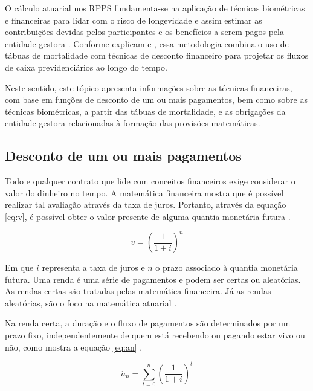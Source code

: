 O cálculo atuarial nos RPPS fundamenta-se na aplicação de técnicas biométricas e financeiras para lidar com o risco de longevidade e assim estimar as contribuições devidas pelos participantes e os benefícios a serem pagos pela entidade gestora \cite{lopes2010impacto}. Conforme explicam  e , essa metodologia combina o uso de tábuas de mortalidade com técnicas de desconto financeiro para projetar os fluxos de caixa previdenciários ao longo do tempo.

Neste sentido, este tópico apresenta informações sobre as técnicas financeiras, com base em funções de desconto de um ou mais pagamentos, bem como sobre as técnicas biométricas, a partir das tábuas de mortalidade, e as obrigações da entidade gestora relacionadas à formação das provisões matemáticas.

\subsection{Desconto de um ou mais pagamentos}

Todo e qualquer contrato que lide com conceitos financeiros exige considerar o valor do dinheiro no tempo. A matemática financeira mostra que é possível realizar tal avaliação através da taxa de juros. Portanto, através da equação \ref{eq:v}, é possível obter o valor presente de alguma quantia monetária futura \cite{rodrigues2012risco}.

\begin{equation}
    v = \left(\frac{1}{1+i}\right)^{n}
    \label{eq:v}
\end{equation}

\noindent Em que $i$ representa a taxa de juros e $n$ o prazo associado à quantia monetária futura. Uma renda é uma série de pagamentos e podem ser certas ou aleatórias. As rendas certas são tratadas pelas matemática financeira. Já as rendas aleatórias, são o foco na matemática atuarial \cite{cordeiro2014calculo, vilanoca1969}.

Na renda certa, a duração e o fluxo de pagamentos são determinados por um prazo fixo, independentemente de quem está recebendo ou pagando estar vivo ou não, como mostra a equação \ref{eq:an} \cite{rodrigues2012risco}.

\begin{equation}
    \ddot{a}_{n} = \sum_{t=0}^{n} \left(\frac{1}{1+i}\right)^{t}
    \label{eq:an}
\end{equation}

